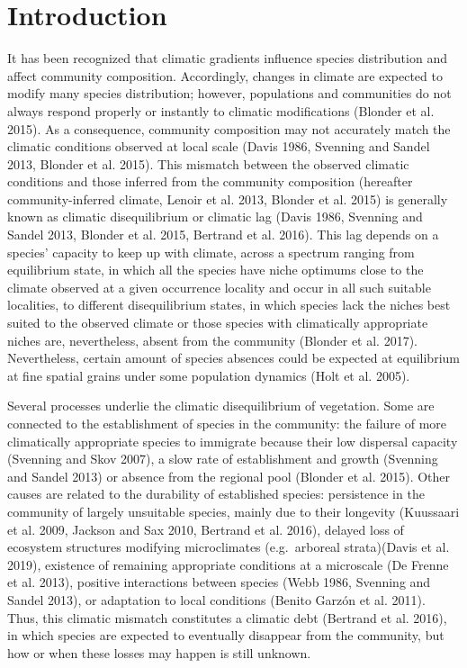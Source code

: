 \documentclass[11pt,twoside]{reedthesis}
\begin{document}
\section{Introduction}\label{introduction-4}

It has been recognized that climatic gradients influence species
distribution and affect community composition. Accordingly, changes in
climate are expected to modify many species distribution; however,
populations and communities do not always respond properly or instantly
to climatic modifications (Blonder et al. 2015). As a consequence,
community composition may not accurately match the climatic conditions
observed at local scale (Davis 1986, Svenning and Sandel 2013, Blonder
et al. 2015). This mismatch between the observed climatic conditions and
those inferred from the community composition (hereafter
community-inferred climate, Lenoir et al. 2013, Blonder et al. 2015) is
generally known as climatic disequilibrium or climatic lag (Davis 1986,
Svenning and Sandel 2013, Blonder et al. 2015, Bertrand et al. 2016).
This lag depends on a species' capacity to keep up with climate, across
a spectrum ranging from equilibrium state, in which all the species have
niche optimums close to the climate observed at a given occurrence
locality and occur in all such suitable localities, to different
disequilibrium states, in which species lack the niches best suited to
the observed climate or those species with climatically appropriate
niches are, nevertheless, absent from the community (Blonder et al.
2017). Nevertheless, certain amount of species absences could be
expected at equilibrium at fine spatial grains under some population
dynamics (Holt et al. 2005).\par

Several processes underlie the climatic disequilibrium of vegetation.
Some are connected to the establishment of species in the community: the
failure of more climatically appropriate species to immigrate because
their low dispersal capacity (Svenning and Skov 2007), a slow rate of
establishment and growth (Svenning and Sandel 2013) or absence from the
regional pool (Blonder et al. 2015). Other causes are related to the
durability of established species: persistence in the community of
largely unsuitable species, mainly due to their longevity (Kuussaari et
al. 2009, Jackson and Sax 2010, Bertrand et al. 2016), delayed loss of
ecosystem structures modifying microclimates (e.g.~arboreal
strata)(Davis et al. 2019), existence of remaining appropriate
conditions at a microscale (De Frenne et al. 2013), positive
interactions between species (Webb 1986, Svenning and Sandel 2013), or
adaptation to local conditions (Benito Garzón et al. 2011). Thus, this
climatic mismatch constitutes a climatic debt (Bertrand et al. 2016), in
which species are expected to eventually disappear from the community,
but how or when these losses may happen is still unknown.\par
\end{document}
